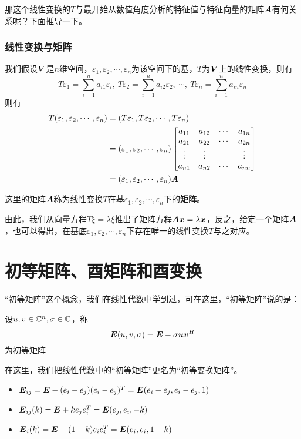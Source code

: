 \documentclass[12pt, a4paper, oneside, UTF8]{ctexbook}
\begin{document}
那这个线性变换的$T$与最开始从数值角度分析的特征值与特征向量的矩阵$\boldsymbol{A}$有何关系呢？下面推导一下。

\subsubsection{线性变换与矩阵}
我们假设$\boldsymbol{V}$是$n$维空间，$\varepsilon_1, \varepsilon_2,\cdots,\varepsilon_n$为该空间下的基，$T$为$\boldsymbol{V}$上的线性变换，则有\[T\varepsilon_1=\sum_{i=1}^{n}a_{i1}\varepsilon_i,\  T\varepsilon_2=\sum_{i=1}^{n}a_{i2}\varepsilon_2,\ \cdots,\ T\varepsilon_n=\sum_{i=1}^{n}a_{in}\varepsilon_n\]则有
\[\begin{aligned}
    T(\varepsilon_1,\varepsilon_2,\cdots,\varepsilon_n)&=(T\varepsilon_1,T\varepsilon_2,\cdots,T\varepsilon_n)\\
    &=(\varepsilon_1, \varepsilon_2,\cdots,\varepsilon_n)\begin{bmatrix}
        a_{11}&a_{12}&\cdots&a_{1n}\\
        a_{21}&a_{22}&\cdots&a_{2n}\\
        \vdots&\vdots&&\vdots\\
        a_{n1}&a_{n2}&\cdots&a_{nn}
    \end{bmatrix}\\
    &=(\varepsilon_1,\varepsilon_2,\cdots,\varepsilon_n)\boldsymbol{A}
\end{aligned}\]

这里的矩阵$\boldsymbol{A}$称为线性变换$T$在基$\varepsilon_1, \varepsilon_2,\cdots,\varepsilon_n$下的\textbf{矩阵}。

由此，我们从向量方程$T\xi=\lambda\xi$推出了矩阵方程$\boldsymbol{A}\boldsymbol{x}=\lambda\boldsymbol{x}$，反之，给定一个矩阵$\boldsymbol{A}$，也可以得出，在基底$\varepsilon_1, \varepsilon_2,\cdots,\varepsilon_n$下存在唯一的线性变换$T$与之对应。

\section{初等矩阵、酉矩阵和酉变换}
“初等矩阵”这个概念，我们在线性代数中学到过，可在这里，“初等矩阵”说的是：
\begin{defn}{}{}
    设$u,v\in\mathbb{C}^n,\sigma\in\mathbb{C}$，称\[\boldsymbol{E}(u,v,\sigma)=\boldsymbol{E}-\sigma \boldsymbol{uv}^H\]为初等矩阵
\end{defn}
在这里，我们把线性代数中的“初等矩阵”更名为“初等变换矩阵”。
\begin{itemize}
    \item $\boldsymbol{E}_{ij}=\boldsymbol{E}-(e_i-e_j)(e_i-e_j)^T=\boldsymbol{E}(e_i-e_j,e_i-e_j,1)$
    \item $\boldsymbol{E}_{ij}(k)=\boldsymbol{E}+ke_je_i^T=\boldsymbol{E}(e_j,e_i,-k)$
    \item $\boldsymbol{E}_i(k)=\boldsymbol{E}-(1-k)e_ie_i^T=\boldsymbol{E}(e_i,e_i,1-k)$
\end{itemize}
\end{document}
